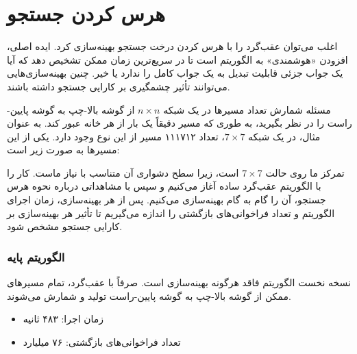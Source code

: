 \section{هرس کردن جستجو}

اغلب می‌توان عقب‌گرد را
با هرس کردن درخت جستجو بهینه‌سازی کرد.
ایده اصلی، افزودن «هوشمندی» به الگوریتم است
تا در سریع‌ترین زمان ممکن تشخیص دهد
که آیا یک جواب جزئی قابلیت تبدیل
به یک جواب کامل را ندارد یا خیر.
چنین بهینه‌سازی‌هایی می‌توانند تأثیر
چشمگیری بر کارایی جستجو داشته باشند.

مسئله شمارش تعداد مسیرها
در یک شبکه $n \times n$ از گوشه بالا-چپ
به گوشه پایین-راست را در نظر بگیرید، به طوری که
مسیر دقیقاً یک بار از هر خانه عبور کند.
به عنوان مثال، در یک شبکه $7 \times 7$،
تعداد ۱۱۱۷۱۲ مسیر از این نوع وجود دارد.
یکی از این مسیرها به صورت زیر است:

\begin{center}
\end{center}

تمرکز ما روی حالت $7 \times 7$ است، زیرا سطح دشواری آن متناسب با نیاز ماست. کار را با الگوریتم عقب‌گرد ساده آغاز می‌کنیم و سپس با مشاهداتی درباره نحوه هرس جستجو، آن را گام به گام بهینه‌سازی می‌کنیم. پس از هر بهینه‌سازی، زمان اجرای الگوریتم و تعداد فراخوانی‌های بازگشتی را اندازه می‌گیریم تا تأثیر هر بهینه‌سازی بر کارایی جستجو مشخص شود.

\subsubsection{الگوریتم پایه}

نسخه نخست الگوریتم فاقد هرگونه بهینه‌سازی است. صرفاً با عقب‌گرد، تمام مسیرهای ممکن از گوشه بالا-چپ به گوشه پایین-راست تولید و شمارش می‌شوند.

\begin{itemize}
\item
زمان اجرا: ۴۸۳ ثانیه
\item
تعداد فراخوانی‌های بازگشتی: ۷۶ میلیارد
\end{itemize}

